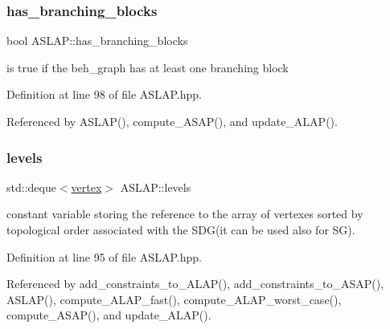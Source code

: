 \mbox{\label{classASLAP_aef4d41c0497eb290e2d74653cf3f2d5b}} 
\subsubsection{\texorpdfstring{has\+\_\+branching\+\_\+blocks}{has\_branching\_blocks}}
{\footnotesize\ttfamily bool A\+S\+L\+A\+P\+::has\+\_\+branching\+\_\+blocks\hspace{0.3cm}{\ttfamily [private]}}



is true if the beh\+\_\+graph has at least one branching block 



Definition at line 98 of file A\+S\+L\+A\+P.\+hpp.



Referenced by A\+S\+L\+A\+P(), compute\+\_\+\+A\+S\+A\+P(), and update\+\_\+\+A\+L\+A\+P().

\mbox{\label{classASLAP_aab673e7df4048cecb2cf78d33f104f37}} 
\subsubsection{\texorpdfstring{levels}{levels}}
{\footnotesize\ttfamily std\+::deque$<$\hyperlink{graph_8hpp_abefdcf0544e601805af44eca032cca14}{vertex}$>$ A\+S\+L\+A\+P\+::levels\hspace{0.3cm}{\ttfamily [private]}}



constant variable storing the reference to the array of vertexes sorted by topological order associated with the S\+D\+G(it can be used also for S\+G). 



Definition at line 95 of file A\+S\+L\+A\+P.\+hpp.



Referenced by add\+\_\+constraints\+\_\+to\+\_\+\+A\+L\+A\+P(), add\+\_\+constraints\+\_\+to\+\_\+\+A\+S\+A\+P(), A\+S\+L\+A\+P(), compute\+\_\+\+A\+L\+A\+P\+\_\+fast(), compute\+\_\+\+A\+L\+A\+P\+\_\+worst\+\_\+case(), compute\+\_\+\+A\+S\+A\+P(), and update\+\_\+\+A\+L\+A\+P().

